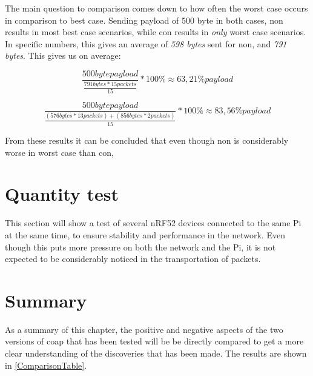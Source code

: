The main question to comparison comes down to how often the worst case occurs in comparison to best case. Sending payload of 500 byte in both cases, \gls{non} results in most best case scenarios, while \gls{con} results in \textit{only} worst case scenarios. In specific numbers, this gives an average of \textit{598 bytes} sent for \gls{non}, and \textit{791 bytes}. This gives us on average: 

\begin{equation} \label{bestWorstEquation}
	\frac{500 byte payload}{\frac{791 bytes * 15 packets}{15}}*100 \% \approx 63,21 \% payload
\end{equation}

\begin{equation} \label{bestWorstEquation2}
\frac{500 byte payload}{\frac{(576 bytes * 13 packets)+(856 bytes * 2 packets)}{15}}*100 \% \approx 83,56 \% payload
\end{equation}

From these results it can be concluded that even though \gls{non} is considerably worse in worst case than \gls{con}, 






\section{Quantity test} 

This section will show a test of several nRF52 devices connected to the same Pi at the same time, to ensure stability and performance in the network. Even though this puts more pressure on both the network and the Pi, it is not expected to be considerably noticed in the transportation of packets. 


\section{Summary}

As a summary of this chapter, the positive and negative aspects of the two versions of \gls{coap} that has been tested will be be directly compared to get a more clear understanding of the discoveries that has been made. The results are shown in \ref{ComparisonTable}.   



